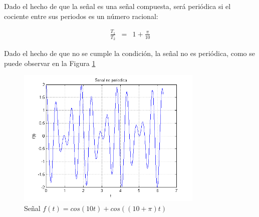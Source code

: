 \documentclass[twocolumn]{article}
\begin{document}
Dado el hecho de que la señal es una señal compuesta, será periódica si el cociente entre sus periodos es un número racional:

\begin{eqnarray*}
\frac{T_1}{T_2} &=& 1 + \frac{\pi}{10}
\end{eqnarray*}

Dado el hecho de que no se cumple la condición, la señal no es periódica, como se puede observar en la Figura \ref{fig_5c}

\begin{figure}[!t]
\centering
\includegraphics[width=3.5in]{imgs/5c.png}
\caption{Señal $f(t) = cos(10t) + cos((10+\pi)t)$}
\label{fig_5c}
\end{figure}
\end{document}
